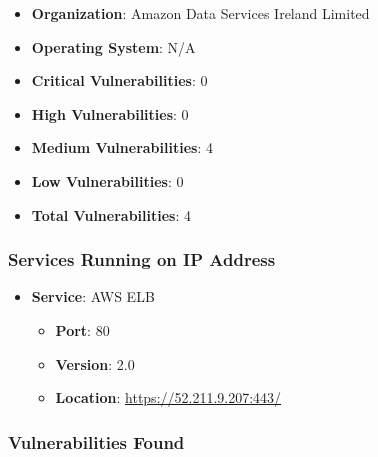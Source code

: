 \documentclass{article}
\begin{document}
\begin{itemize}
    \item \textbf{Organization}: Amazon Data Services Ireland Limited
    \item \textbf{Operating System}:  N/A 
    \item \textbf{Critical Vulnerabilities}: 0
    \item \textbf{High Vulnerabilities}: 0
    \item \textbf{Medium Vulnerabilities}: 4
    \item \textbf{Low Vulnerabilities}: 0
    \item \textbf{Total Vulnerabilities}: 4
\end{itemize}

\subsubsection*{Services Running on IP Address}

\begin{itemize}
    
        \item \textbf{Service}: AWS ELB
        \begin{itemize}
            \item \textbf{Port}: 80
            \item \textbf{Version}:  2.0 
            \item \textbf{Location}: \href{ https://52.211.9.207:443/ }{ https://52.211.9.207:443/ }
        \end{itemize}
    
\end{itemize}


\subsubsection*{Vulnerabilities Found}
\end{document}
